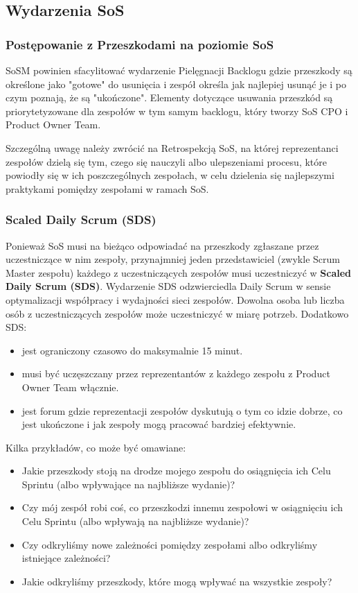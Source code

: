 \documentclass[12pt,a4paper,parskip=full]{scrartcl}
\begin{document}
\subsection{Wydarzenia SoS}

\subsubsection{Postępowanie z Przeszkodami na poziomie SoS}

SoSM powinien sfacylitować wydarzenie Pielęgnacji Backlogu gdzie przeszkody są określone jako "gotowe" do usunięcia i zespół określa jak najlepiej usunąć je i po czym poznają, że są "ukończone". Elementy dotyczące usuwania przeszkód są priorytetyzowane dla zespołów w tym samym backlogu, który tworzy SoS CPO i Product Owner Team.

Szczególną uwagę należy zwrócić na Retrospekcją SoS, na której reprezentanci zespołów dzielą się tym, czego się nauczyli albo ulepszeniami procesu, które powiodły się w ich poszczególnych zespołach, w celu dzielenia się najlepszymi praktykami pomiędzy zespołami w ramach SoS.  %

\subsubsection{Scaled Daily Scrum (SDS)}

Ponieważ SoS musi na bieżąco odpowiadać na przeszkody zgłaszane przez uczestniczące w nim zespoły, przynajmniej jeden przedstawiciel (zwykle Scrum Master zespołu) każdego z uczestniczących zespołów musi uczestniczyć w \textbf{Scaled Daily Scrum (SDS)}. Wydarzenie SDS odzwierciedla Daily Scrum w sensie optymalizacji współpracy i wydajności sieci zespołów. Dowolna osoba lub liczba osób z uczestniczących zespołów może uczestniczyć w miarę potrzeb. Dodatkowo SDS:

\begin{itemize}
	\item jest ograniczony czasowo do maksymalnie 15 minut.
	\item musi być uczęszczany przez reprezentantów z każdego zespołu z Product Owner Team włącznie.
	\item jest forum gdzie reprezentacji zespołów dyskutują o tym co idzie dobrze, co jest ukończone i jak zespoły mogą pracować bardziej efektywnie. 
\end{itemize}
	
Kilka przykładów, co może być omawiane:
\begin{itemize}
	\item Jakie przeszkody stoją na drodze mojego zespołu do osiągnięcia ich Celu Sprintu (albo wpływające na najbliższe wydanie)?
	\item Czy mój zespół robi coś, co przeszkodzi innemu zespołowi w osiągnięciu ich Celu Sprintu (albo wpływają na najbliższe wydanie)?
	\item Czy odkryliśmy nowe zależności pomiędzy zespołami albo odkryliśmy istniejące zależności?
	\item Jakie odkryliśmy przeszkody, które mogą wpływać na wszystkie zespoły?
\end{itemize}
\end{document}
